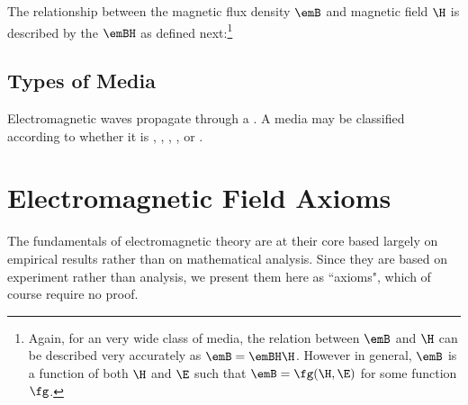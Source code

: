 The relationship between the magnetic flux density $\emB$
and magnetic field $\H$ is described by the  $\emBH$
as defined next:\footnote{
   Again, for an very wide class of media, the relation between $\emB$ and $\H$
   can be described very accurately as $\emB = \emBH \H$.
   However in general, $\emB$ is a function of both $\H$ and $\E$ such that
   $\emB = \fg(\H,\E)$ for some function $\fg$.
   }
\begin{definition}
\label{def:bh}
\end{definition}

\subsection{Types of Media}
Electromagnetic waves propagate through a .
A media may be classified according to whether it is , , 
, ,
or .

\begin{definition}
\label{def_simple}
\end{definition}

\section{Electromagnetic Field Axioms}
The fundamentals of electromagnetic theory are at their core based
largely on empirical results rather than on mathematical analysis.
Since they are based on experiment rather than analysis,
we present them here as ``axioms", which of course require no proof.

